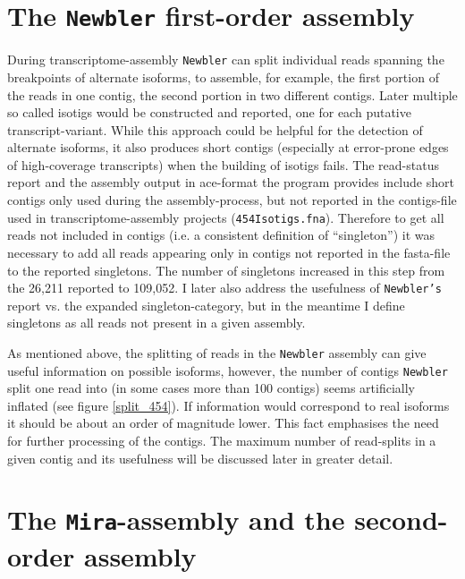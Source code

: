 \section{The \texttt{Newbler} first-order assembly}
\label{sec:new-fist}

During transcriptome-assembly \texttt{Newbler} can split individual
reads spanning the breakpoints of alternate isoforms, to assemble, for
example, the first portion of the reads in one contig, the second
portion in two different contigs. Later multiple so called isotigs
would be constructed and reported, one for each putative
transcript-variant. While this approach could be helpful for the
detection of alternate isoforms, it also produces short contigs
(especially at error-prone edges of high-coverage transcripts) when
the building of isotigs fails. The read-status report and the assembly
output in ace-format the program provides include short contigs only
used during the assembly-process, but not reported in the contigs-file
used in transcriptome-assembly projects
(\texttt{454Isotigs.fna}). Therefore to get all reads not included in
contigs (i.e. a consistent definition of ``singleton'') it was
necessary to add all reads appearing only in contigs not reported in
the fasta-file to the reported singletons. The number of singletons
increased in this step from the 26,211 reported to 109,052. I later
also address the usefulness of \texttt{Newbler's} report vs. the
expanded singleton-category, but in the meantime I define singletons
as all reads not present in a given assembly.


As mentioned above, the splitting of reads in the \texttt{Newbler}
assembly can give useful information on possible isoforms, however,
the number of contigs \texttt{Newbler} split one read into (in some
cases more than 100 contigs) seems artificially inflated (see figure
\ref{split_454}). If information would correspond to real isoforms it
should be about an order of magnitude lower. This fact emphasises the
need for further processing of the contigs. The maximum number of
read-splits in a given contig and its usefulness will be discussed
later in greater detail.

\section{The \texttt{Mira}-assembly and the second-order assembly}
\label{sec:assembly-sec}

